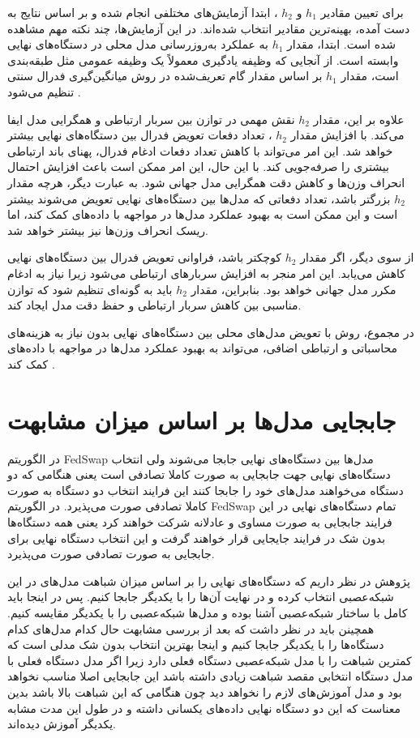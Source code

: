 برای تعیین مقادیر
$h_1$
و
$h_2$%
، ابتدا آزمایش‌های مختلفی انجام شده و بر اساس نتایج به دست آمده، بهینه‌ترین مقادیر انتخاب شده‌اند. در این آزمایش‌ها، چند نکته مهم مشاهده شده است. ابتدا، مقدار
$h_1$
به عملکرد به‌روزرسانی مدل محلی در دستگاه‌های نهایی وابسته است. از آنجایی که وظیفه یادگیری معمولاً یک وظیفه عمومی مثل طبقه‌بندی است، مقدار
$h_1$
بر اساس مقدار گام تعریف‌شده در روش میانگین‌گیری فدرال سنتی تنظیم می‌شود
\cite{chiu2020semisupervised}.

علاوه بر این، مقدار
$h_2$
نقش مهمی در توازن بین سربار ارتباطی و همگرایی مدل ایفا می‌کند. با افزایش مقدار
$h_2$%
، تعداد دفعات تعویض فدرال بین دستگاه‌های نهایی بیشتر خواهد شد. این امر می‌تواند با کاهش تعداد دفعات ادغام فدرال، پهنای باند ارتباطی بیشتری را صرفه‌جویی کند. با این حال، این امر ممکن است باعث افزایش احتمال انحراف وزن‌ها و کاهش دقت همگرایی مدل جهانی شود. به عبارت دیگر، هرچه مقدار
$h_2$
بزرگتر باشد، تعداد دفعاتی که مدل‌ها بین دستگاه‌های نهایی تعویض می‌شوند بیشتر است و این ممکن است به بهبود عملکرد مدل‌ها در مواجهه با داده‌های
کمک کند، اما ریسک انحراف وزن‌ها نیز بیشتر خواهد شد.

از سوی دیگر، اگر مقدار
$h_2$
کوچکتر باشد، فراوانی تعویض فدرال بین دستگاه‌های نهایی کاهش می‌یابد. این امر منجر به افزایش سربارهای ارتباطی می‌شود زیرا نیاز به ادغام مکرر مدل جهانی خواهد بود. بنابراین، مقدار
$h_2$
باید به گونه‌ای تنظیم شود که توازن مناسبی بین کاهش سربار ارتباطی و حفظ دقت مدل ایجاد کند.

در مجموع، روش
با تعویض مدل‌های محلی بین دستگاه‌های نهایی بدون نیاز به هزینه‌های محاسباتی و ارتباطی اضافی، می‌تواند به بهبود عملکرد مدل‌ها در مواجهه با داده‌های
کمک کند
\cite{chiu2020semisupervised}.



\section{جابجایی مدل‌ها بر اساس میزان مشابهت}
در الگوریتم FedSwap مدل‌ها بین دستگاه‌های نهایی جابجا می‌شوند ولی انتخاب دستگاه‌های نهایی جهت جابجایی به صورت کاملا تصادفی است یعنی هنگامی که دو دستگاه می‌خواهند مدل‌های خود را جابجا کنند این فرایند انتخاب دو دستگاه به صورت کاملا تصادفی صورت می‌پذیرد. در الگوریتم FedSwap تمام دستگاه‌های نهایی در این فرایند جابجایی به صورت مساوی و عادلانه شرکت خواهند کرد یعنی همه دستگاه‌ها بدون شک در فرایند جایجایی قرار خواهند گرفت و این انتخاب دستگاه نهایی برای جابجایی به صورت تصادفی صورت می‌پذیرد.

در این ‎پژوهش در نظر داریم که دستگاه‌های نهایی را بر اساس میزان شباهت‌ مدل‌‌های شبکه‌عصبی انتخاب کرده و در نهایت آن‌ها را با یکدیگر جابجا کنیم. پس در اینجا باید کامل با ساختار شبکه‌عصبی آشنا بوده و مدل‌ها شبکه‌عصبی را با یکدیگر مقایسه کنیم. همچینن باید در نظر داشت که بعد از بررسی مشابهت حال کدام مدل‌های کدام دستگاه‌ها را با یکدیگر جابجا کنیم و اینجا بهترین انتخاب بدون شک مدلی است که کمترین شباهت را با مدل شبکه‌عصبی دستگاه فعلی دارد زیرا اگر مدل دستگاه فعلی با مدل دستگاه انتخابی مقصد شباهت زیادی داشته باشد این جابجایی اصلا مناسب نخواهد بود و مدل آموزش‌های لازم را نخواهد دید چون هنگامی که این شباهت بالا باشد بدین معناست که این دو دستگاه نهایی داده‌های یکسانی داشته و در طول این مدت مشابه یکدیگر آموزش دیده‌اند. 

